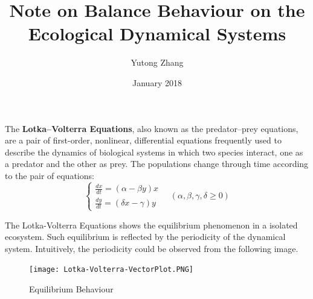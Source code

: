 \documentclass{article}
\title{Note on Balance Behaviour on the Ecological Dynamical Systems}
\author{Yutong Zhang}
\date{January 2018}
\begin{document}
\maketitle

The \textbf{Lotka–Volterra Equations}, also known as the predator–prey equations, are a pair of first-order, nonlinear, differential equations frequently used to describe the dynamics of biological systems in which two species interact, one as a predator and the other as prey. The populations change through time according to the pair of equations:
$$
\begin{cases}
\displaystyle{\frac{dx}{dt}}=(\alpha-\beta y)x \\
\displaystyle{\frac{dy}{dt}}=(\delta x - \gamma)y
\end{cases}\quad
(\alpha,\beta,\gamma,\delta\geq0)
$$

The Lotka-Volterra Equations shows the equilibrium phenomenon in a isolated ecosystem. Such equilibrium is reflected by the periodicity of the dynamical system. Intuitively, the periodicity could be observed from the following image.
\begin{figure}[!htbp]
    \centering
    \texttt{[image: Lotka-Volterra-VectorPlot.PNG]}
    \caption{Equilibrium Behaviour}
    \label{fig:lotka_volterra_vectorplot}
\end{figure}
\end{document}
